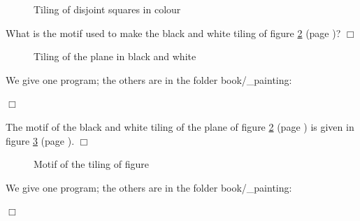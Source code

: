 \begin{figure}[htbp]
\vspace*{\textwidth}%
\vspace*{25mm}%
%
\vspace*{-\textwidth}%
\vspace*{-25mm}%
\caption{Tiling of disjoint squares in colour}\label{fig:pdcc}
\end{figure}
\begin{exercice}{What is the motif used to make the black and white tiling of figure \ref{fig:pavhexond}
(page \pageref{fig:pavhexond})?
\noindent $\Box$}\end{exercice}
\begin{figure}[htbp]
 \caption{Tiling of the plane in black and white}\label{fig:pavhexond}
\end{figure}
\begin{corrige}{
We give one program; the others are in the folder {\idt book/\_painting}:

\noindent $\Box$}\end{corrige}
\begin{corrige}{
The motif of the black and white tiling of the plane of figure \ref{fig:pavhexond}
(page \pageref{fig:pavhexond}) is given in figure \ref{fig:motpavhexond}
(page \pageref{fig:motpavhexond}).
\noindent $\Box$}\end{corrige}
\begin{figure}[htbp]
 \caption{Motif of the tiling of figure \protect{\ref{fig:pavhexond}}}\label{fig:motpavhexond}
\end{figure}
\begin{corrige}{
We give one program; the others are in the folder {\idt book/\_painting}:
\label{prog:BalleEnCouleur}

\noindent $\Box$}\end{corrige}

\vfill

